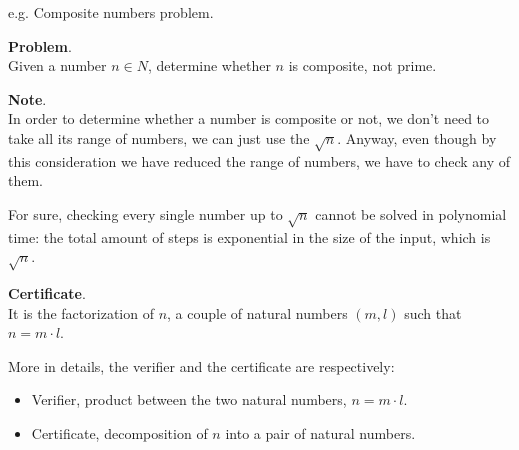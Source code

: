\begin{example}[title = Composite Numbers]
    e.g. Composite numbers problem. \vspace{7pt}

    \textbf{Problem}. \\
    Given a number $n \in N$, determine whether $n$ is composite, not prime. \vspace{7pt}

    \textbf{Note}. \\
    In order to determine whether a number is composite or not, we don't need to take all its range of numbers, we can just use the $\sqrt{n}$. Anyway, 
    even though by this consideration we have reduced the range of numbers, we have to check any of them. \vspace{7pt}
    
    For sure, checking every single number up to $\sqrt{n}$ cannot be solved in polynomial time: the total amount of steps is exponential in the size of the input, which is $\sqrt{n}$. \vspace{7pt}

    \textbf{Certificate}. \\
    It is the factorization of $n$, a couple of natural numbers $(m,l)$ such that $n = m \cdot l$. \vspace{7pt}

    More in details, the verifier and the certificate are respectively:
    \begin{itemize}
        \renewcommand{\labelitemi}{-}
        \item Verifier, product between the two natural numbers, $n = m \cdot l$.
        \item Certificate, decomposition of $n$ into a pair of natural numbers.
    \end{itemize}
\end{example}
